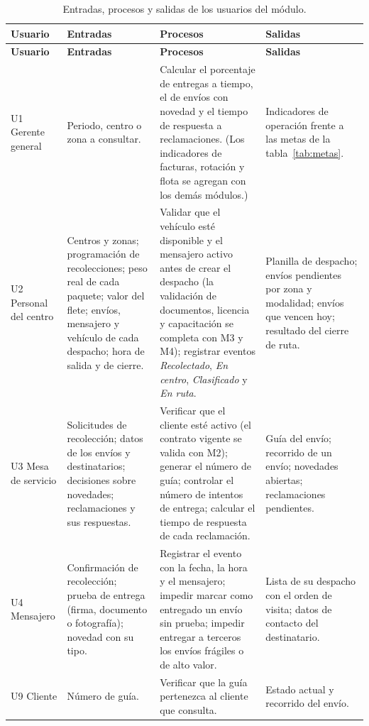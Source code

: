 {\singlespacing\small
\begin{longtable}{L{1.9cm} L{3.9cm} L{4.6cm} L{3.9cm}}
\caption{Entradas, procesos y salidas de los usuarios del módulo.}
\label{tab:eps}\\
\toprule
\textbf{Usuario} & \textbf{Entradas} & \textbf{Procesos} & \textbf{Salidas} \\
\midrule
\endfirsthead
\toprule
\textbf{Usuario} & \textbf{Entradas} & \textbf{Procesos} & \textbf{Salidas} \\
\midrule
\endhead
\bottomrule
\endfoot
U1 Gerente general &
Periodo, centro o zona a consultar. &
Calcular el porcentaje de entregas a tiempo, el de envíos con novedad y
el tiempo de respuesta a reclamaciones. (Los indicadores de facturas,
rotación y flota se agregan con los demás módulos.) &
Indicadores de operación frente a las metas de la
tabla~\ref{tab:metas}. \\
\midrule
U2 Personal del centro &
Centros y zonas; programación de recolecciones; peso real de cada
paquete; valor del flete; envíos, mensajero y vehículo de cada despacho;
hora de salida y de cierre. &
Validar que el vehículo esté disponible y el mensajero activo antes de
crear el despacho (la validación de documentos, licencia y capacitación
se completa con M3 y M4); registrar eventos \textit{Recolectado},
\textit{En centro}, \textit{Clasificado} y \textit{En ruta}. &
Planilla de despacho; envíos pendientes por zona y modalidad; envíos que
vencen hoy; resultado del cierre de ruta. \\
\midrule
U3 Mesa de servicio &
Solicitudes de recolección; datos de los envíos y destinatarios;
decisiones sobre novedades; reclamaciones y sus respuestas. &
Verificar que el cliente esté activo (el contrato vigente se valida con
M2); generar el número de guía; controlar el número de intentos de
entrega; calcular el tiempo de respuesta de cada reclamación. &
Guía del envío; recorrido de un envío; novedades abiertas; reclamaciones
pendientes. \\
\midrule
U4 Mensajero &
Confirmación de recolección; prueba de entrega (firma, documento o
fotografía); novedad con su tipo. &
Registrar el evento con la fecha, la hora y el mensajero; impedir marcar
como entregado un envío sin prueba; impedir entregar a terceros los
envíos frágiles o de alto valor. &
Lista de su despacho con el orden de visita; datos de contacto del
destinatario. \\
\midrule
U9 Cliente &
Número de guía. &
Verificar que la guía pertenezca al cliente que consulta. &
Estado actual y recorrido del envío. \\
\end{longtable}
\par}

